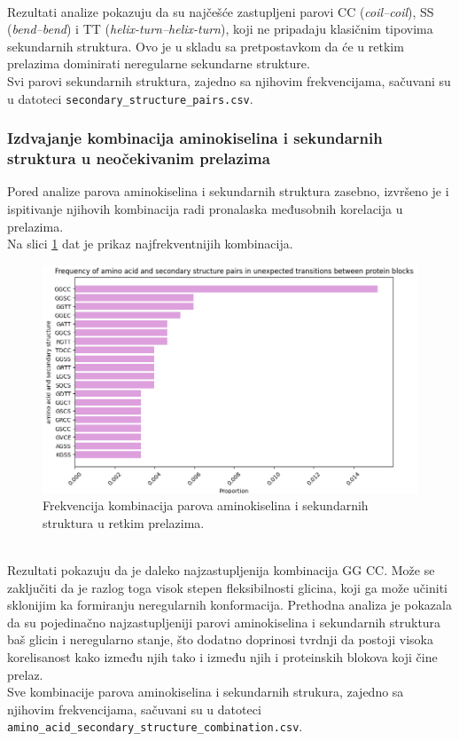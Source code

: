 \documentclass[a4paper,12pt]{article}
\begin{document}
\\
Rezultati analize pokazuju da su najčešće zastupljeni parovi CC (\textit{coil–coil}), SS (\textit{bend–bend}) i TT (\textit{helix-turn–helix-turn}), koji ne pripadaju klasičnim tipovima sekundarnih struktura. Ovo je u skladu sa pretpostavkom da će u retkim prelazima dominirati neregularne sekundarne strukture. \\
Svi parovi sekundarnih struktura, zajedno sa njihovim frekvencijama, sačuvani su u datoteci \texttt{secondary\_structure\_pairs.csv}.
\subsubsection{Izdvajanje kombinacija aminokiselina i sekundarnih struktura u neočekivanim prelazima}
Pored analize parova aminokiselina i sekundarnih struktura zasebno, izvršeno je i ispitivanje njihovih kombinacija radi pronalaska međusobnih korelacija u prelazima.  \\
Na slici \ref{Slika:aas2freq} dat je prikaz najfrekventnijih kombinacija.
\begin{figure}[htbp]
    \centering
    \includegraphics[width=1\textwidth]{./images/aas2freq.png}
    \caption{Frekvencija kombinacija parova aminokiselina i sekundarnih struktura u retkim prelazima.}
    \label{Slika:aas2freq}
\end{figure}
\\
Rezultati pokazuju da je daleko najzastupljenija kombinacija GG CC. Može se zaključiti da je razlog toga visok stepen fleksibilnosti glicina, koji ga može učiniti sklonijim ka formiranju neregularnih konformacija. Prethodna analiza je pokazala da su pojedinačno najzastupljeniji parovi aminokiselina i sekundarnih struktura baš glicin i neregularno stanje, što dodatno doprinosi tvrdnji da postoji visoka korelisanost kako između njih tako i između njih i proteinskih blokova koji čine prelaz.\\
Sve kombinacije parova aminokiselina i sekundarnih strukura, zajedno sa njihovim frekvencijama, sačuvani su u datoteci \\\texttt{amino\_acid\_secondary\_structure\_combination.csv}.
\end{document}

